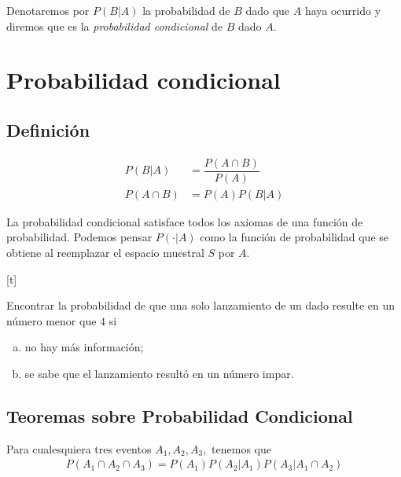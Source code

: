   Denotaremos por $P(B|A)$
 la probabilidad de $B$ dado que $A$ haya ocurrido y diremos que es la \emph{probabilidad condicional} de $B$ dado $A.$


 \section{Probabilidad condicional}

 \subsection{Definición}

{}
\begin{defn}
 \begin{align}
  P(B|A)&=\dfrac{P(A\cap B)}{P(A)} \\
  P(A\cap B) &= P(A)P(B|A)
 \end{align}
\end{defn}


{}
\begin{rem}
 La probabilidad condicional satisface todos los axiomas de una función de probabilidad.  Podemos pensar $P(\cdot|A)$ como la función de probabilidad que se obtiene al reemplazar el espacio muestral $S$ por $A.$
\end{rem}


[t]{}
\begin{exmp}
 \label{exmp:1.13}
 Encontrar la probabilidad de que una solo lanzamiento de un dado resulte en un número menor que $4$ si
 \begin{enumerate}[(a)]
  \item no hay más información; 
  \item se sabe que el lanzamiento resultó en un número impar.
 \end{enumerate}

\end{exmp}


\subsection{Teoremas sobre Probabilidad Condicional}
{}
\begin{thm}
 \label{thm:1.9}
 Para cualesquiera tres eventos $A_{1},A_{2},A_{3},$ tenemos que
 \begin{align}
  \label{1.19}
  P(A_{1} \cap A_{2} \cap A_{3})=P(A_{1})P(A_{2}|A_{1})P(A_{3}|A_{1} \cap A_{2})
 \end{align}
\end{thm}


